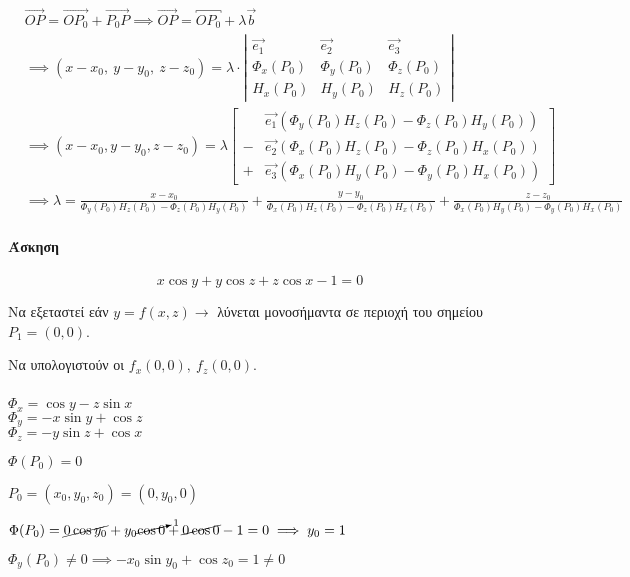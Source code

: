\documentclass[11pt,a4paper,titlepage]{article}
\begin{document}
\subparagraph{}
\begin{align*}
&\overrightarrow{OP} = \overrightarrow{OP_0} + \overrightarrow{P_0P} \implies \overrightarrow{OP} = \overbracket{OP_0} + \lambda \vec b \\
&\implies (x-x_0,\ y-y_0,\ z-z_0) = \lambda \cdot \left|
\begin{matrix}
\overrightarrow{e_1} & \overrightarrow{e_2} & \overrightarrow{e_3} \\
\Phi_x(P_0) & \Phi_y(P_0) & \Phi_z(P_0) \\
H_x(P_0) & H_y(P_0)&H_z(P_0)
\end{matrix}
\right|
\\
&\implies
(x-x_0,y-y_0,z-z_0) = \lambda \left[
\begin{array}{rl}
&\overrightarrow{e_1} \left(\Phi_y(P_0)H_z(P_0)-\Phi_z(P_0)H_y(P_0) \right) \\
- & \overrightarrow{e_2} \left(\Phi_x(P_0)H_z(P_0)- \Phi_z(P_0)H_x(P_0) \right) \\
+ & \overrightarrow{e_3} \left( \Phi_x(P_0)H_y(P_0)-\Phi_y(P_0)H_x(P_0) \right)
\end{array}
\right]
\\ &\implies
\lambda = \frac{x-x_0}{\Phi_y(P_0)H_z(P_0)-\Phi_z(P_0)H_y(P_0)} + \frac{y-y_0}{\Phi_x(P_0)H_z(P_0)- \Phi_z(P_0)H_x(P_0)} + \frac{z-z_0}{ \Phi_x(P_0)H_y(P_0)-\Phi_y(P_0)H_x(P_0)}
\end{align*}

\paragraph{Άσκηση}
\[
x\cos y+y\cos z +z\cos x - 1=0
\]

Να εξεταστεί εάν \( y=f(x,z) \to \) λύνεται μονοσήμαντα σε περιοχή του σημείου \( P_1=(0,0) \).

Να υπολογιστούν οι \( f_x(0,0),\ f_z(0,0) \).

\subparagraph{}
\begin{enumparen}
\item \( \Phi_x = \cos y -z\sin x\)\\
\(\Phi_y = -x\sin y + \cos z \)\\
\( \Phi_z = -y\sin z + \cos x \)
\item \(\Phi(P_0)=0 \)

\(P_0 = (x_0,y_0,z_0) = (0,y_0,0) \)

\(\Phi(P_0) = \cancel{0\cos y_0} + y_0 \cancelto{1}{\cos 0} + \cancel{0\cos0} -1 =0 \implies y_0 = 1 \)
\item \( \Phi_y(P_0) \neq0 \implies -x_0\sin y_0 + \cos z_0 = 1 \neq 0 \)
\end{enumparen}
\end{document}
